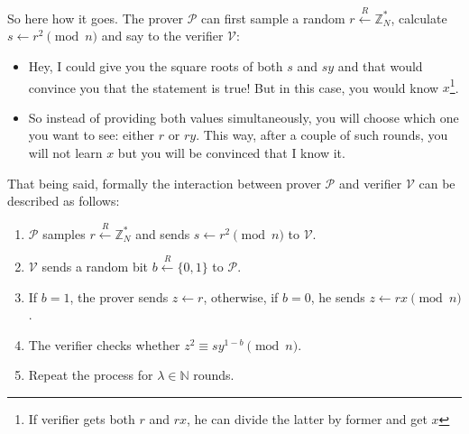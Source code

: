 \documentclass[../lecture-notes.tex]{subfiles}
\begin{document}
So here how it goes. The prover $\mathcal{P}$ can first sample a random $r \xleftarrow{R} \mathbb{Z}_N^*$, calculate $s \gets r^2 \pmod{n}$ and say to the verifier $\mathcal{V}$: 
\begin{itemize}
    \item Hey, I could give you the square roots of both $s$ and $sy$ and that would convince you that the statement is true! But in this case, you would know $x$\footnote{If verifier gets both $r$ and $rx$, he can divide the latter by former and get $x$}.
    \item So instead of providing both values simultaneously, you will choose which one you want to see: either $r$ or $ry$. This way, after a couple of such rounds, you will not learn $x$ but you will be convinced that I know it.
\end{itemize}

That being said, formally the interaction between prover $\mathcal{P}$ and verifier $\mathcal{V}$ can be described as follows:
\begin{enumerate}
    \item $\mathcal{P}$ samples $r \xleftarrow{R} \mathbb{Z}_N^*$ and sends $s \gets r^2 \pmod{n}$ to $\mathcal{V}$.
    \item $\mathcal{V}$ sends a random bit $b \xleftarrow{R} \{0,1\}$ to $\mathcal{P}$.
    \item If $b=1$, the prover sends $z \gets r$, otherwise, if $b=0$, he sends $z \gets rx \pmod{n}$.
    \item The verifier checks whether $z^2 \equiv sy^{1-b} \pmod{n}$.
    \item Repeat the process for $\lambda \in \mathbb{N}$ rounds.
\end{enumerate}
\end{document}

